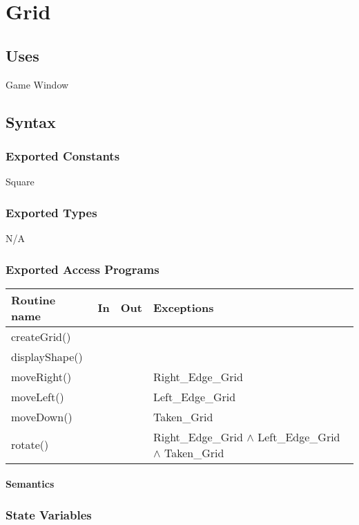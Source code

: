 \documentclass[12pt]{article}
\begin{document}
\section*{Grid}

\subsection*{Uses}

Game Window

\subsection*{Syntax}

\subsubsection*{Exported Constants}

Square

\subsubsection*{Exported Types}

N/A

\subsubsection* {Exported Access Programs}

\begin{tabular}{| l | l | l | l |}
\hline
\textbf{Routine name} & \textbf{In} & \textbf{Out} & \textbf{Exceptions}\\
\hline
createGrid() &  & &\\
\hline
displayShape() &  &  &\\
\hline
moveRight() &  &   &Right\_Edge\_Grid\\
\hline
moveLeft() &   &   &Left\_Edge\_Grid\\
\hline
moveDown() &  & & Taken\_Grid \\
\hline
rotate() & &  &Right\_Edge\_Grid $\land$ Left\_Edge\_Grid $\land$ Taken\_Grid \\
\hline
\end{tabular}

\paragraph* {Semantics}

\subsubsection*{State Variables}
\end{document}
